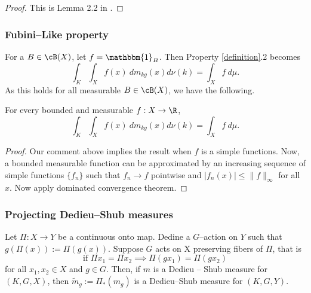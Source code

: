 \documentclass[10pt]{amsart}
\numberwithin{equation}{section}     %
\begin{document}
\begin{proof}
    This is Lemma 2.2 in \cite{avila2012nonuniform}.
\end{proof}
\noindent

\subsubsection{Fubini--Like property} 
For a $B \in \cB(X)$, let $f = \mathbbm{1}_B$. Then Property \ref{definition}.2 becomes $$\int_K \int_X f(x) \ dm_{kg}(x) d\nu(k) = \int_X f \ d\mu.$$ As this holds for all measurable $B \in \cB(X)$, we have the following. 

\begin{lemma} \label{fubini}
    For every bounded and measurable $f:X \to \R$,  $$\int_K \int_X f(x) \ dm_{kg}(x) d\nu(k) = \int_X f \ d\mu.$$
\end{lemma}

\begin{proof}
    Our comment above implies the result when $f$ is a simple functions. Now, a bounded measurable function can be approximated by an increasing sequence of simple functions $\{f_n\}$ such that $f_n \to f$ pointwise and $|f_n(x)| \leq \|f\|_\infty$ for all $x$. Now apply dominated convergence theorem.
    
\end{proof}

\subsubsection{Projecting Dedieu--Shub measures}

\begin{lemma} \label{projection}
    Let $\Pi:X \to Y$ be a continuous onto map. Dedine a $G$--action on $Y$ such that $g(\Pi(x)) := \Pi(g(x))$. Suppose $G$ acts on X preserving fibers of $\Pi$, that is $$\text{if } \Pi x_1 = \Pi x_2 \implies \Pi (gx_1) = \Pi (gx_2)$$ for all $x_1,x_2 \in X$  and $g \in G$. 
    Then, if $m$ is a Dedieu -- Shub measure for $(K,G,X)$, then $\tilde{m}_g := \Pi_*(m_g)$ is a Dedieu--Shub measure for $(K,G,Y)$. 
\end{lemma}
\end{document}
